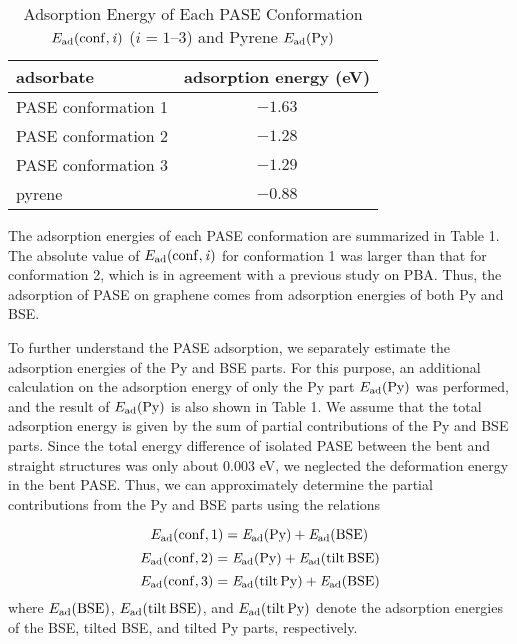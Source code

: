 \documentclass[journal=acsodf,manuscript=article]{achemso}
\begin{document}
\begin{table}[t]
\caption{Adsorption Energy of Each PASE Conformation $E_{\rm ad}(\rm conf,\it i)$ ($i = 1$--$3$) and Pyrene $E_{\rm ad}(\rm Py)$}
\begin{tabular}{|l|c|} \hline
adsorbate & adsorption energy (eV)  \\ \hline \hline
PASE conformation 1 & $-1.63$   \\
PASE conformation 2 & $-1.28$   \\ 
PASE conformation 3 & $-1.29$  \\ 
pyrene & $-0.88$   \\   \hline                                    
 \end{tabular}
\end{table}

The adsorption energies of each PASE conformation are summarized in Table 1. The absolute value of $E_{\rm ad}(\rm conf,\it i)$ for conformation 1 was larger than that for conformation 2, which is in agreement with a previous study on PBA\cite{bailey2014study}. Thus, the adsorption of PASE on graphene comes from adsorption energies of both Py and BSE.

To further understand the PASE adsorption, we separately estimate the adsorption energies of the Py and BSE parts. For this purpose, an additional calculation on the adsorption energy of only the Py part $E_{\rm ad}(\rm Py)$ was performed, and the result of $E_{\rm ad}(\rm Py)$ is also shown in Table 1. We assume that the total adsorption energy is given by the sum of partial contributions of the Py and BSE parts. Since the total energy difference of isolated PASE between the bent and straight structures was only about 0.003 eV, we neglected the deformation energy in the bent PASE. Thus, we can approximately determine the partial contributions from the Py and BSE parts using the relations

\begin{equation}
E_{\rm ad}(\rm conf,1) = {\it E}_{\rm ad}(\rm Py) + {\it E}_{\rm ad}(\rm BSE)
\end{equation}
\begin{equation}
E_{\rm ad}(\rm conf,2) = {\it E}_{\rm ad}(\rm Py) + {\it E}_{\rm ad}(\rm tilt \, BSE)
\end{equation}
\begin{equation}
E_{\rm ad}(\rm conf,3) = {\it E}_{\rm ad}(\rm tilt \, Py) + {\it E}_{\rm ad}(\rm BSE)
\end{equation}where $E_{\rm ad}(\rm BSE)$, $E_{\rm ad}(\rm tilt \, BSE)$, and $E_{\rm ad}(\rm tilt \, Py)$ denote the adsorption energies of the BSE, tilted BSE, and tilted Py parts, respectively.
\end{document}
